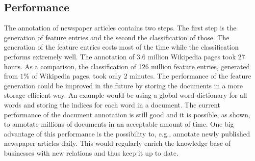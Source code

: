 \subsection*{Performance}
The annotation of newspaper articles contains two steps. The first step is the generation of feature entries and the second the classification of those. The generation of the feature entries costs most of the time while the classification performs extremely well. The annotation of 3.6 million Wikipedia pages took 27 hours. As a comparison, the classification of 126 million feature entries, generated from $1\%$ of Wikipedia pages, took only 2 minutes. The performance of the feature generation could be improved in the future by storing the documents in a more storage efficient way. An example would be using a global word dictionary for all words and storing the indices for each word in a document. The current performance of the document annotation is still good and it is possible, as shown, to annotate millions of documents in an acceptable amount of time. One big advantage of this performance is the possibility to, e.g., annotate newly published newspaper articles daily. This would regularly enrich the knowledge base of businesses with new relations and thus keep it up to date.\par

